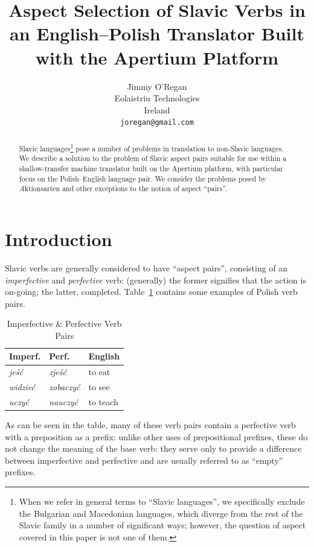 \documentclass[11pt]{article}
\author{Jimmy O'Regan\\  Eolaistriu Technologies \\  Ireland \\  {\tt \small   joregan@gmail.com} }
\title{Aspect Selection of Slavic Verbs in an English--Polish Translator Built with the Apertium Platform}
\begin{document}
\maketitle

  \begin{abstract}
   Slavic languages\footnote{
   When we refer in general terms to ``Slavic languages'', we specifically exclude 
   the Bulgarian and Macedonian languages, which diverge from 
   the rest of the Slavic family in a number of significant ways;
   however, the question of aspect covered in this paper is not
   one of them.} 
   pose a number of problems in translation to non-Slavic
   languages. We describe a solution to the problem of Slavic aspect pairs
   suitable for use within a shallow-transfer machine translator
   built on the Apertium platform, with particular focus on the
   Polish--English language pair. We consider the problems posed
   by {\emph Aktionsarten} and other exceptions to the notion of
   aspect ``pairs''.
  \end{abstract}

\section{Introduction}
Slavic verbs are generally considered to have ``aspect pairs'',
consisting of an {\it imperfective} and {\it perfective} verb: 
(generally) the former signifies that the action is on-going; 
the latter, completed. Table~\ref{table:vbpairs} contains
some examples of Polish verb pairs.

\begin{table}[htdp]
\caption{Imperfective \& Perfective Verb Pairs}
\label{table:vbpairs}
\begin{center}
\begin{tabular}{|l|l|l|}
\hline
{\sc Imperf.} & {\sc Perf.} & English \\
\hline
{\it je{\'s\'c}} & {\it zje{\'s\'c}} & to eat \\
{\it widzie{\'c}} & {\it zobaczy{\'c}} & to see \\
{\it uczy{\'c}} & {\it nauczy{\'c}} & to teach \\
\hline
\end{tabular}
\end{center}
\end{table}

As can be seen in the table, many of these verb pairs contain
a perfective verb with a preposition as a prefix: unlike other
uses of prepositional prefixes, these do not change the meaning
of the base verb: they serve only to provide a difference 
between imperfective and perfective and are usually referred to as
``empty'' prefixes.
\end{document}
